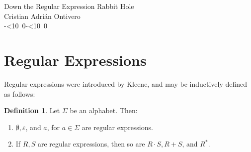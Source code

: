 \documentclass{article}
\theoremstyle{definition}
\newtheorem{defn}{Definition}
\newcommand{\emptystr}{\varepsilon}
\def\isodate{\leavevmode\hbox{\the\year-\twodigits\month-\twodigits\day}}
\def\twodigits#1{\ifnum#1<10 0\fi\the#1}
\begin{document}
\begin{center}
  {\LARGE Down the Regular Expression Rabbit Hole}\\[.2cm]
  Cristian Adrián Ontivero \\[.05cm]%
  \isodate
\end{center}

\vspace{0.2 cm}
\section{Regular Expressions}
Regular expressions were introduced by Kleene, and may be inductively defined as follows:
\begin{defn}
Let $\Sigma$ be an alphabet. Then:
\begin{enumerate}
  \item $\emptyset, \emptystr$, and $a$, for $a \in \Sigma$ are regular expressions.
  \item If $R, S$ are regular expressions, then so are $R\cdot S, R+S$, and $R^*$.
\end{enumerate}
\end{defn}






%
\end{document}
